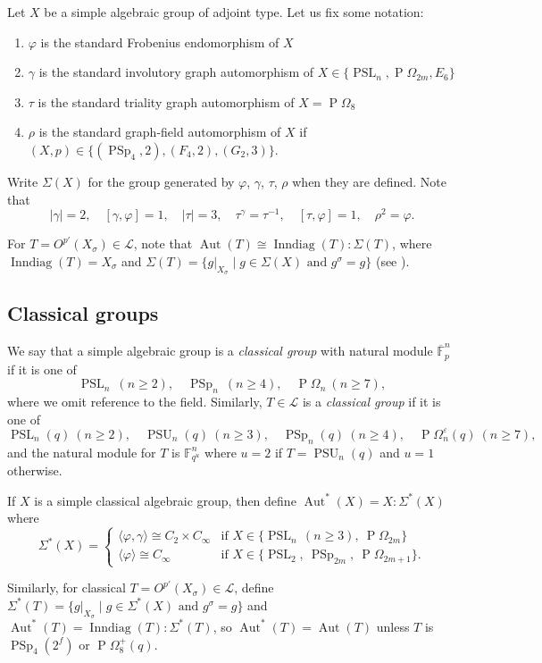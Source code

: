\documentclass[11pt]{article}
\numberwithin{equation}{section}
\theoremstyle{shdefinition}
\theoremstyle{shplain}
\newcommand{\g}{\gamma}
\newcommand{\e}{\varepsilon}
\newcommand{\p}{\varphi}
\newcommand{\s}{\sigma}
\renewcommand{\t}{\tau}
\renewcommand{\L}{\mathcal{L}}
\newcommand{\<}{\langle}
\renewcommand{\>}{\rangle}
\renewcommand{\geq}{\geqslant}
\newcommand{\Aut}{\operatorname{Aut}}
\newcommand{\Inndiag}{\operatorname{Inndiag}}
\newcommand{\F}{\mathbb{F}}
\newcommand{\FF}{\overline{\F}}
\renewcommand{\:}{\colon}
\newcommand{\PSL}{\operatorname{PSL}}
\newcommand{\PSp}{\operatorname{PSp}}
\newcommand{\PSU}{\operatorname{PSU}}
\newcommand{\Om}{\Omega}
\newcommand{\POm}{\operatorname{P}\!\Om}
\begin{document}
Let $X$ be a simple algebraic group of adjoint type. Let us fix some notation:
\begin{enumerate}[ ]
\item $\p$ is the standard Frobenius endomorphism of $X$
\item $\g$ is the standard involutory graph automorphism of $X  \in \{ \PSL_n, \POm_{2m}, E_6 \}$
\item $\t$ is the standard triality graph automorphism of $X = \POm_8$
\item $\rho$ is the standard graph-field automorphism of $X$ if $(X,p) \in \{ (\PSp_4, 2), (F_4,2), (G_2,3) \}$. 
\end{enumerate}
Write $\Sigma(X)$ for the group generated by $\p$, $\g$, $\t$, $\rho$ when they are defined. Note that
\[
|\g|=2, \quad [\g,\p]=1, \quad |\t|=3, \quad \t^\g=\t^{-1}, \quad [\t,\p]=1, \quad \rho^2=\p.
\] 

For $T = O^{p'}(X_\s)\in \L$, note that $\Aut(T) \cong \Inndiag(T){:}\Sigma(T)$, where $\Inndiag(T) = X_\s$ and $\Sigma(T) = \{ g|_{X_\s} \mid \text{$g \in \Sigma(X)$ and $g^\s = g$} \}$ (see \cite[Theorem~2.5.4]{ref:GorensteinLyonsSolomon98}).


\subsection{Classical groups} \label{ss:lie_classical}

We say that a simple algebraic group is a \emph{classical group} with natural module $\FF_p^n$ if it is one of
\[
\PSL_n \ (n \geq 2), \quad \PSp_n \ (n \geq 4), \quad \POm_n \ (n \geq 7),
\]
where we omit reference to the field. Similarly, $T \in \L$ is a \emph{classical group} if it is one of
\[
\PSL_n(q) \ (n \geq 2), \quad \PSU_n(q) \ (n \geq 3), \quad \PSp_n(q) \ (n \geq 4), \quad \POm^\e_n(q) \ (n \geq 7),
\]
and the natural module for $T$ is $\F_{q^u}^n$ where $u=2$ if $T = \PSU_n(q)$ and $u=1$ otherwise.

If $X$ is a simple classical algebraic group, then define $\Aut^*(X) = X{:}\Sigma^*(X)$ where
\[
\Sigma^*(X) = \left\{ 
\begin{array}{ll}
\< \p, \g \> \cong C_2 \times C_\infty & \text{if $X \in \{ \PSL_n\, (n \geq 3),\ \POm_{2m} \}$}  \\
\< \p \>      \cong C_\infty           & \text{if $X \in \{ \PSL_2,\ \PSp_{2m},\ \POm_{2m+1} \}$.}
\end{array}
\right.
\]

Similarly, for classical $T = O^{p'}(X_\s) \in \L$, define $\Sigma^*(T) = \{ g|_{X_\s} \mid \text{$g \in \Sigma^*(X)$ and $g^\s = g$} \}$ and $\Aut^*(T) = \Inndiag(T){:}\Sigma^*(T)$, so $\Aut^*(T) = \Aut(T)$ unless $T$ is $\PSp_4(2^f)$ or $\POm_8^+(q)$. 
\end{document}
